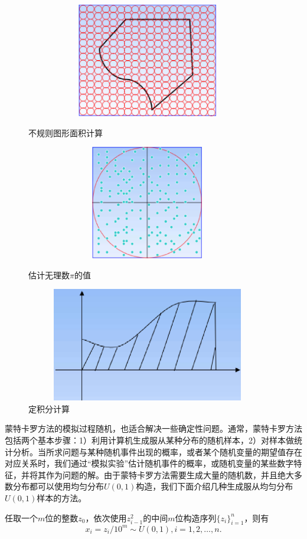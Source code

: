 \begin{figure}[ht]
\centering
  \begin{minipage}[t]{0.3\linewidth}
  \centering
  \includegraphics[width=0.95\textwidth,height=5cm]{figures/irregularity.eps}
  \caption{不规则图形面积计算}\label{fig:irr-mc}
  \end{minipage}
  \begin{minipage}[t]{0.3\linewidth}
  \centering
  \includegraphics[width=0.95\textwidth,height=5cm]{figures/pi.eps}
  \caption{估计无理数$\pi$的值}\label{fig:pi-mc}
  \end{minipage}
  \begin{minipage}[t]{0.3\linewidth}
  \centering
  \includegraphics[width=0.95\textwidth,height=5cm]{figures/integration.eps}
  \caption{定积分计算}\label{fig:int-mc}
  \end{minipage}
\end{figure}

蒙特卡罗方法的模拟过程随机，也适合解决一些确定性问题。通常，蒙特卡罗方法包括两个基本步骤：1）利用计算机生成服从某种分布的随机样本，2）对样本做统计分析。当所求问题与某种随机事件出现的概率，或者某个随机变量的期望值存在对应关系时，我们通过“模拟实验”估计随机事件的概率，或随机变量的某些数字特征，并将其作为问题的解。由于蒙特卡罗方法需要生成大量的随机数，并且绝大多数分布都可以使用均匀分布$U(0,1)$构造，我们下面介绍几种生成服从均匀分布$U(0,1)$样本的方法。
\begin{proposition}[平方取中法]%
任取一个$m$位的整数$z_0$，依次使用$z_{i-1}^2$的中间$m$位构造序列$\{z_i\}_{i=1}^n$，则有\[x_i=z_i/10^m\sim U(0,1), i = 1, 2,\ldots,n.\]
\end{proposition}

